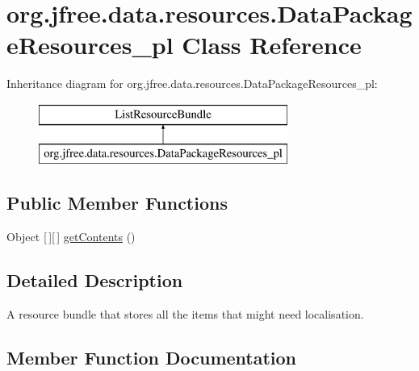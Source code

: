 \hypertarget{classorg_1_1jfree_1_1data_1_1resources_1_1_data_package_resources__pl}{}\section{org.\+jfree.\+data.\+resources.\+Data\+Package\+Resources\+\_\+pl Class Reference}
\label{classorg_1_1jfree_1_1data_1_1resources_1_1_data_package_resources__pl}
Inheritance diagram for org.\+jfree.\+data.\+resources.\+Data\+Package\+Resources\+\_\+pl\+:\begin{figure}[H]
\begin{center}
\leavevmode
\includegraphics[height=2.000000cm]{classorg_1_1jfree_1_1data_1_1resources_1_1_data_package_resources__pl}
\end{center}
\end{figure}
\subsection*{Public Member Functions}
\begin{DoxyCompactItemize}
\item 
Object \mbox{[}$\,$\mbox{]}\mbox{[}$\,$\mbox{]} \mbox{\hyperlink{classorg_1_1jfree_1_1data_1_1resources_1_1_data_package_resources__pl_aeea607c9737d0796d4e8872a005137de}{get\+Contents}} ()
\end{DoxyCompactItemize}


\subsection{Detailed Description}
A resource bundle that stores all the items that might need localisation. 

\subsection{Member Function Documentation}
\mbox{\label{classorg_1_1jfree_1_1data_1_1resources_1_1_data_package_resources__pl_aeea607c9737d0796d4e8872a005137de}} 
